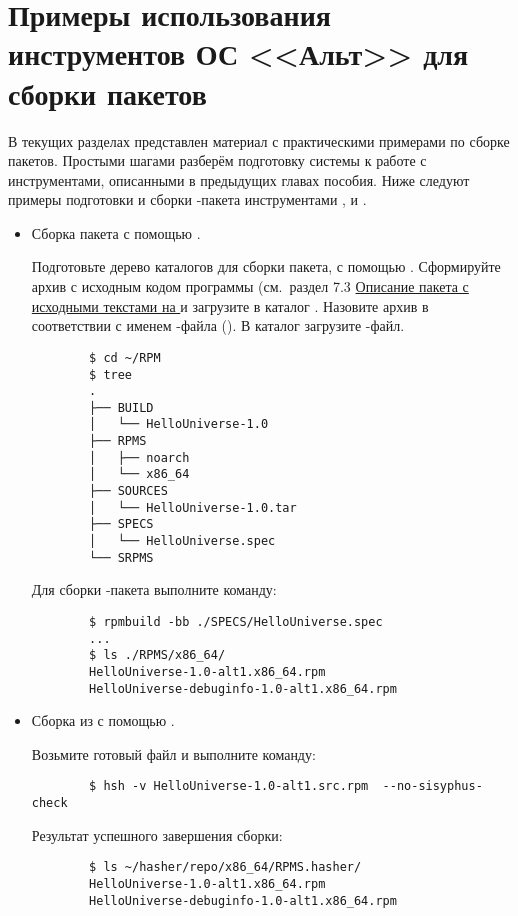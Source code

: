 \chapter{Примеры использования инструментов ОС <<Альт>> для сборки пакетов}

В текущих разделах представлен материал с практическими примерами по сборке пакетов. 
Простыми шагами разберём подготовку системы к работе с инструментами, описанными в 
предыдущих главах пособия. Ниже следуют примеры подготовки и сборки -пакета 
инструментами ,  и .

\begin{itemize}
	\item {} Сборка пакета с помощью .
	
		Подготовьте дерево каталогов для сборки пакета, с помощью . 
		Сформируйте  архив с исходным кодом программы  (см.~раздел 7.3 \href{hello_universe_src}{Описание пакета с исходными текстами на } и загрузите 
		в каталог . Назовите архив в соответствии с именем 
		-файла (). В каталог  загрузите -файл. 
	\begin{verbatim}
		$ cd ~/RPM
		$ tree
		.
		├── BUILD
		│   └── HelloUniverse-1.0
		├── RPMS
		│   ├── noarch
		│   └── x86_64
		├── SOURCES
		│   └── HelloUniverse-1.0.tar
		├── SPECS
		│   └── HelloUniverse.spec
		└── SRPMS
	\end{verbatim}
	
	Для сборки -пакета выполните команду: 
	\begin{verbatim}
		$ rpmbuild -bb ./SPECS/HelloUniverse.spec 
		...
		$ ls ./RPMS/x86_64/
		HelloUniverse-1.0-alt1.x86_64.rpm
		HelloUniverse-debuginfo-1.0-alt1.x86_64.rpm
	\end{verbatim}
	
\item {} Сборка из  с помощью .
	
	Возьмите готовый файл  и выполните команду:
	\begin{verbatim}
		$ hsh -v HelloUniverse-1.0-alt1.src.rpm  --no-sisyphus-check
	\end{verbatim} 
	
	Результат успешного завершения сборки: 
	\begin{verbatim}
		$ ls ~/hasher/repo/x86_64/RPMS.hasher/
		HelloUniverse-1.0-alt1.x86_64.rpm
		HelloUniverse-debuginfo-1.0-alt1.x86_64.rpm
	\end{verbatim}
	

\end{itemize}
